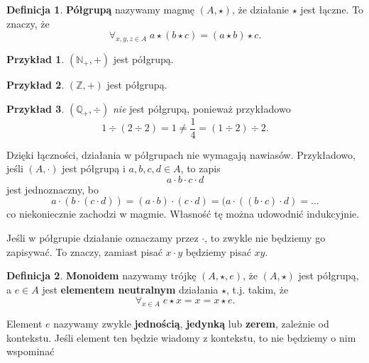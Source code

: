 \documentclass{article}
\theoremstyle{definition}
\newtheorem{definition}{Definicja}[section]
\newtheorem{example}{Przykład}[section]
\begin{document}
\begin{definition}
	\textbf{Półgrupą} nazywamy magmę $(A, \star)$, że działanie $\star$ jest łączne. To znaczy, że
	\begin{equation*}
		\forall_{x,y,z \in A}\; a \star (b \star c) = (a \star b) \star c.
	\end{equation*}
\end{definition}

\begin{example}
	$(\mathbb{N}_+, +)$ jest półgrupą.
\end{example}

\begin{example}
	$(\mathbb{Z}, +)$ jest półgrupą.
\end{example}

\begin{example}
	$(\mathbb{Q}_+, \div)$ \textit{nie} jest półgrupą, ponieważ przykładowo
	\begin{equation*}
		1 \div (2 \div 2) = 1 \neq \frac{1}{4} = (1\div2)\div2.
	\end{equation*}
\end{example}

Dzięki łączności,
	działania w półgrupach nie wymagają nawiasów.
Przykładowo, jeśli $(A, \cdot)$ jest półgrupą i $a, b, c, d \in A$,
	to zapis
\begin{equation}
	a \cdot b \cdot c \cdot d
\end{equation}
	jest jednoznaczny, bo
\begin{equation}
		a \cdot (b \cdot (c \cdot d)) = 
		(a \cdot b) \cdot (c \cdot d) =
		(a \cdot ((b \cdot c) \cdot d) = \dots
\end{equation}
	co niekoniecznie zachodzi w magmie.
Własność tę można udowodnić indukcyjnie.

Jeśli w półgrupie działanie oznaczamy przez $\cdot$,
	to zwykle nie będziemy go zapisywać.
To znaczy, zamiast pisać $x \cdot y$ będziemy pisać $xy$.

\begin{definition}
	\textbf{Monoidem} nazywamy trójkę $(A, \star, e)$,
		że $(A, \star)$ jest półgrupą,
		a $e\in A$ jest \textbf{elementem neutralnym} działania $\star$,
		t.j. takim, że
	\begin{equation}
		\forall_{x \in A}\; e \star x = x = x \star e.
	\end{equation}
\end{definition}

Element $e$ nazywamy zwykle \textbf{jednością},
	\textbf{jedynką} lub \textbf{zerem},
	zależnie od kontekstu.
Jeśli element ten będzie wiadomy z kontekstu,
	to nie będziemy o nim wspominać
\end{document}
